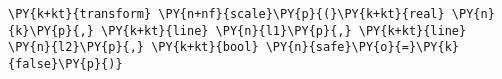 \begin{Verbatim}[commandchars=\\\{\}]
    \PY{k+kt}{transform} \PY{n+nf}{scale}\PY{p}{(}\PY{k+kt}{real} \PY{n}{k}\PY{p}{,} \PY{k+kt}{line} \PY{n}{l1}\PY{p}{,} \PY{k+kt}{line} \PY{n}{l2}\PY{p}{,} \PY{k+kt}{bool} \PY{n}{safe}\PY{o}{=}\PY{k}{false}\PY{p}{)}
\end{Verbatim}
